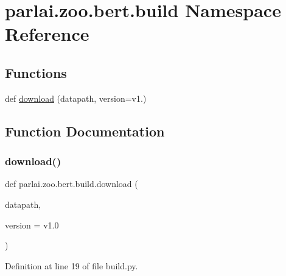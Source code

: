 \hypertarget{namespaceparlai_1_1zoo_1_1bert_1_1build}{}\section{parlai.\+zoo.\+bert.\+build Namespace Reference}
\label{namespaceparlai_1_1zoo_1_1bert_1_1build}
\subsection*{Functions}
\begin{DoxyCompactItemize}
\item 
def \hyperlink{namespaceparlai_1_1zoo_1_1bert_1_1build_a40206dbfe08db448469e0524dd093200}{download} (datapath, version=\textquotesingle{}v1.\textquotesingle{})
\end{DoxyCompactItemize}


\subsection{Function Documentation}
\mbox{\label{namespaceparlai_1_1zoo_1_1bert_1_1build_a40206dbfe08db448469e0524dd093200}} 
\subsubsection{\texorpdfstring{download()}{download()}}
{\footnotesize\ttfamily def parlai.\+zoo.\+bert.\+build.\+download (\begin{DoxyParamCaption}\item[{}]{datapath,  }\item[{}]{version = {\ttfamily \textquotesingle{}v1.0\textquotesingle{}} }\end{DoxyParamCaption})}



Definition at line 19 of file build.\+py.


